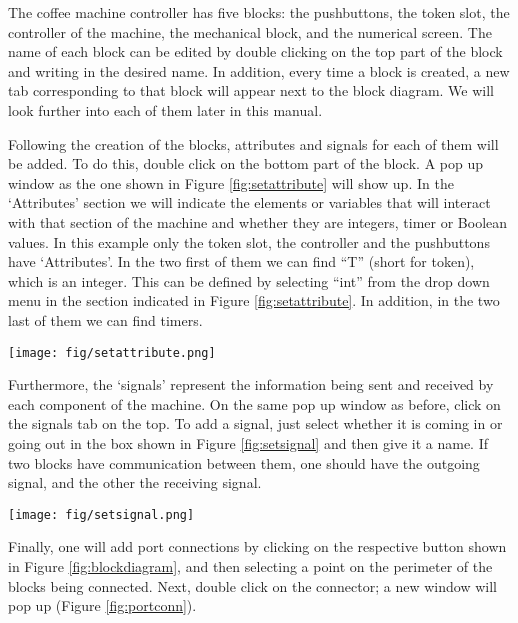\documentclass[12pt]{article}
\begin{document}
The coffee machine controller has five blocks: the pushbuttons, the token slot, the controller of the machine, the mechanical block, and the numerical screen. The name of each block can be edited by double clicking on the top part of the block and writing in the desired name. In addition, every time a block is created, a new tab corresponding to that block will appear next to the block diagram. We will look further into each of them later in this manual.

	Following the creation of the blocks, attributes and signals for each of them will be added. To do this, double click on the bottom part of the block. A pop up window as the one shown in Figure \ref{fig:setattribute} will show up. In the ‘Attributes’ section we will indicate the elements or variables that will interact with that section of the machine and whether they are integers, timer or Boolean values. In this example only the token slot, the controller and the pushbuttons have ‘Attributes’. In the two first of them we can find “T” (short for token), which is an integer. This can be defined by selecting “int” from the drop down menu in the section indicated in Figure \ref{fig:setattribute}. In addition, in the two last of them we can find timers.


\begin{figure*}[htbp]
\centering
\texttt{[image: fig/setattribute.png]}
\caption{Setting attributes of a block} \label{fig:setattribute}
\end{figure*}


Furthermore, the ‘signals’ represent the information being sent and received by each component of the machine. On the same pop up window as before, click on the signals tab on the top. To add a signal, just select whether it is coming in or going out in the box shown in Figure \ref{fig:setsignal} and then give it a name. If two blocks have communication between them, one should have the outgoing signal, and the other the receiving signal. 

\begin{figure*}[htbp]
\centering
\texttt{[image: fig/setsignal.png]}
\caption{Setting signals of a block} \label{fig:setsignal}
\end{figure*}


	Finally, one will add port connections by clicking on the respective button shown in Figure \ref{fig:blockdiagram}, and then selecting a point on the perimeter of the blocks being connected. Next, double click on the connector; a new window will pop up (Figure \ref{fig:portconn}). 
	
\end{document}
